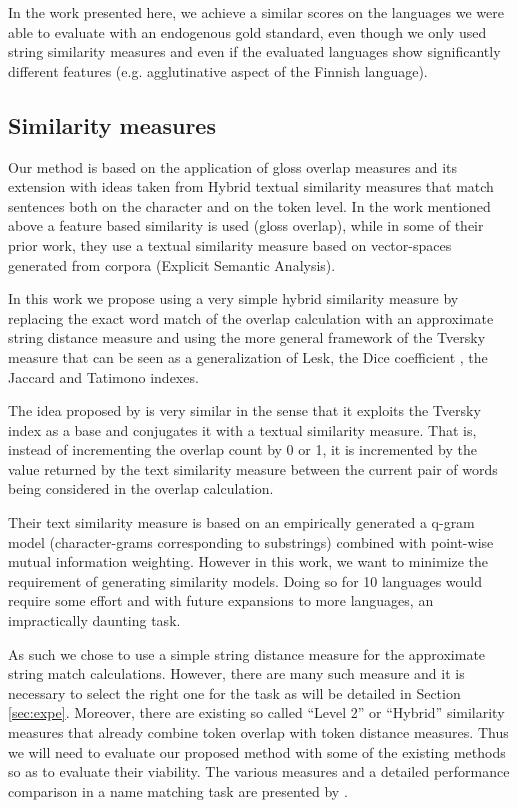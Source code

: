 \documentclass[10pt, a4paper]{article}
\begin{document}
In the work presented here, we achieve a similar scores on the languages we were able to evaluate with an endogenous gold standard, even though we only used string similarity measures and even if the evaluated languages show significantly different features (e.g. agglutinative aspect of the Finnish language).

\subsection{Similarity measures}
Our method is based on the application of gloss overlap measures and its extension with ideas taken from Hybrid textual similarity measures that match sentences both on the character and on the token level. In the work mentioned above \cite{meyer-gurevych:2012:PAPERS} a feature based similarity is used (gloss overlap), while in some of their prior work, \cite{MeyerGurevych:2010}  they use a textual similarity measure based on vector-spaces generated from corpora (Explicit Semantic Analysis).

In this work we propose using a very simple hybrid similarity measure by replacing the exact word match of the overlap calculation with an approximate string distance measure and using the more general framework of the Tversky measure that can be seen as a generalization of Lesk, the Dice coefficient , the Jaccard and Tatimono indexes.

 The idea proposed by \cite{Jimenez2010} is very similar in the sense that it exploits the Tversky index as a base and conjugates it with a textual similarity measure. That is, instead of incrementing the overlap count by 0 or 1, it is incremented by the value returned by the text similarity measure between the current pair of words being considered in the overlap calculation.
 
  Their text similarity measure is based on an empirically generated a q-gram model (character-grams corresponding to substrings) combined with point-wise mutual information weighting. However in this work, we want to minimize the requirement of generating similarity models. Doing so for 10 languages would require some effort and with future expansions to more languages, an impractically daunting task. 
 
 As such we chose to use a simple string distance measure for the approximate string match calculations. However, there are many such measure and it is necessary to select the right one for the task as will be detailed in Section \ref{sec:expe}. Moreover, there are existing so called ``Level 2'' or ``Hybrid'' similarity measures that already combine token overlap with token distance measures. Thus we will need to evaluate our proposed method with some of the existing methods so as to evaluate their viability. The various measures and a detailed performance comparison in a name matching task are presented by \cite{Cohen2003}.
\end{document}
